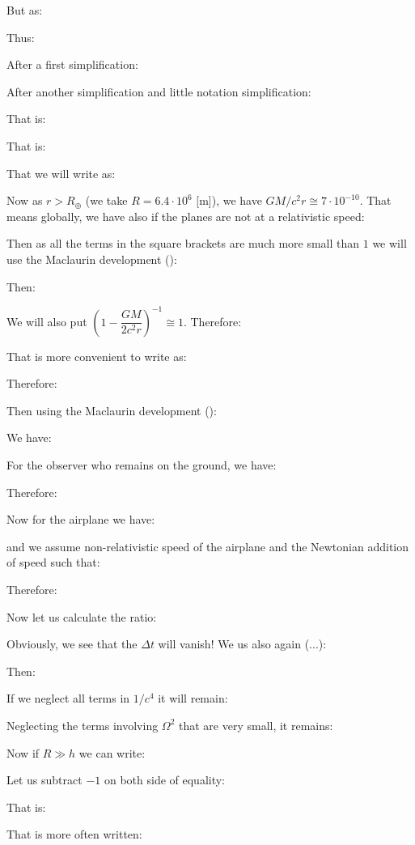 	But as:
	
	Thus:
	
	After a first simplification:
	
	After another simplification and little notation simplification:
	
	That is:
	
	That is:
	
	That we will write as:
	
	Now as $r>R_{\oplus}$ (we take $R=6.4\cdot 10^6$ [m]), we have $GM/c^2r\cong 7\cdot 10^{-10}$. That means globally, we have also if the planes are not at a relativistic speed:
	
	Then as all the terms in the square brackets are much more small than $1$ we will use the Maclaurin development ():
	
	Then:
	
	We will also put $\left(1-\dfrac{GM}{2c^2r}\right)^{-1}\cong 1$. Therefore:
	
	That is more convenient to write as:
	
	Therefore:
	
	Then using the Maclaurin development ():
	
	We have:
	
	For the observer who remains on the ground, we have:
	
	Therefore:
	
	Now for the airplane we have:
	
	and we assume non-relativistic speed of the airplane and the Newtonian addition of speed such that:
	
	Therefore:
	
	Now let us calculate the ratio:
	
	Obviously, we see that the $\Delta t$ will vanish! We us also again (...):
	
	Then:
	
	If we neglect all terms in $1/c^4$ it will remain:
	
	Neglecting the terms involving $\Omega^2$ that are very small, it remains:
	
	Now if $R\gg h$ we can write:
	 
	Let us subtract $-1$ on both side of equality:
	 
	That is:
	 
	That is more often written:
	 
